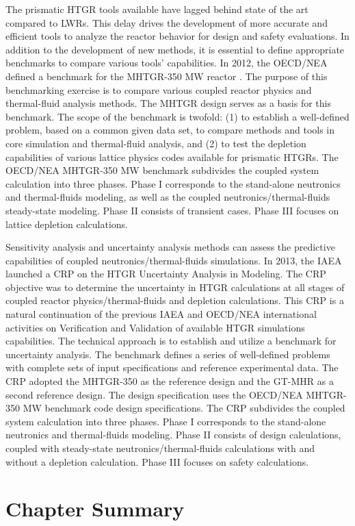 The prismatic \gls{HTGR} tools available have lagged behind state of the art compared to \glspl{LWR}.
This delay drives the development of more accurate and efficient tools to analyze the reactor behavior for design and safety evaluations.
In addition to the development of new methods, it is essential to define appropriate benchmarks to compare various tools' capabilities.
In 2012, the \gls{OECD}/\gls{NEA} defined a benchmark for the \gls{MHTGR}-350 MW reactor \cite{oecd_nea_benchmark_2017}.
The purpose of this benchmarking exercise is to compare various coupled reactor physics and thermal-fluid analysis methods.
The MHTGR design serves as a basis for this benchmark.
The scope of the benchmark is twofold: (1) to establish a well-defined problem, based on a common given data set, to compare methods and tools in core simulation and thermal-fluid analysis, and (2) to test the depletion capabilities of various lattice physics codes available for prismatic \glspl{HTGR}.
The OECD/NEA MHTGR-350 MW benchmark subdivides the coupled system calculation into three phases.
Phase I corresponds to the stand-alone neutronics and thermal-fluids modeling, as well as the coupled neutronics/thermal-fluids steady-state modeling.
Phase II consists of transient cases.
Phase III focuses on lattice depletion calculations.

Sensitivity analysis and uncertainty analysis methods can assess the predictive capabilities of coupled neutronics/thermal-fluids simulations.
In 2013, the IAEA launched a \gls{CRP} \cite{tyobeka_htgr_2011} on the \gls{HTGR} Uncertainty Analysis in Modeling.
The \gls{CRP} objective was to determine the uncertainty in \gls{HTGR} calculations at all stages of coupled reactor physics/thermal-fluids and depletion calculations.
This \gls{CRP} is a natural continuation of the previous IAEA and OECD/NEA international activities \cite{iaea_evaluation_2003}\cite{reitsma_oecd-neansc_2008} on Verification and Validation of available \gls{HTGR} simulations capabilities.
The technical approach is to establish and utilize a benchmark for uncertainty analysis.
The benchmark defines a series of well-defined problems with complete sets of input specifications and reference experimental data.
The CRP adopted the MHTGR-350 as the reference design and the GT-MHR as a second reference design.
The design specification uses the OECD/NEA MHTGR-350 MW benchmark \cite{oecd_nea_benchmark_2017} code design specifications.
The CRP subdivides the coupled system calculation into three phases.
Phase I corresponds to the stand-alone neutronics and thermal-fluids modeling.
Phase II consists of design calculations, coupled with steady-state neutronics/thermal-fluids calculations with and without a depletion calculation.
Phase III focuses on safety calculations.

\section{Chapter Summary}
\label{sec:litreview-summary}

